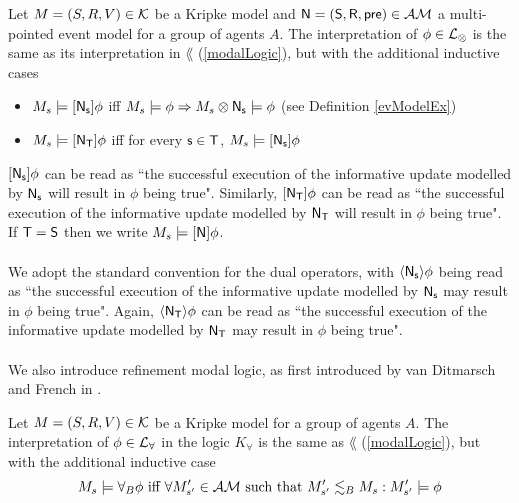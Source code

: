 \begin{defn} \label{actModelLogic}
Let $M = (S, R, V) \in \mathcal{K}$ be a Kripke model and $\mathrm{\mathsf{\mathrm{\mathsf{N}}
  = (S, R, pre)}} \in
\mathcal{AM}$ a multi-pointed event model for a group of agents $A$.
The interpretation of $\phi \in \mathcal{L}_{\otimes}$ is the same as its interpretation in $\lang$
(\ref{modalLogic}), but with the additional
inductive cases
\begin{itemize}
	\item $M_s \models [{\mathrm{\mathsf{\mathrm{\mathsf{N}}_s}}}] \phi$ iff $M_s \models
  \phi \Rightarrow M_s \otimes \mathrm{\mathsf{\mathrm{\mathsf{N}}_s}} \models
	\phi$ (see Definition \ref{evModelEx})
	\item $M_s \models [{\mathrm{\mathsf{\mathrm{\mathsf{N}}_T}}}] \phi$ iff for every $\mathrm{\mathsf{s
    \in T}}$, $M_s \models [{\mathrm{\mathsf{\mathrm{\mathsf{N}}_s}}}] \phi$ 
\end{itemize}
\end{defn}
$[{\mathrm{\mathsf{\mathrm{\mathsf{N}}_s}}}] \phi$ can be read as ``the successful execution of the informative update modelled by
$\mathrm{\mathsf{\mathrm{\mathsf{N}}_s}}$ will result in $\phi$ being true".
Similarly, $[{\mathrm{\mathsf{\mathrm{\mathsf{N}}_T}}}] \phi$ can be read as ``the successful execution of the informative update
modelled by $\mathrm{\mathsf{\mathrm{\mathsf{N}}_T}}$ will result in $\phi$ being true".
If $\mathrm{\mathsf{T = S}}$ then we write $M_s \models [{\mathrm{\mathsf{\mathrm{\mathsf{N}}}}}] \phi$.\\
\\
We adopt the standard convention for the dual operators, with $\langle {
   \ensuremath {\mathrm{\mathsf{\mathrm{\mathsf{N}}_s}}}  } \rangle \phi$ being
read as ``the successful execution of the informative update modelled by
$\mathrm{\mathsf{\mathrm{\mathsf{N}}_s}}$ may result in
$\phi$ being true".
Again, $\langle {  \ensuremath {\mathrm{\mathsf{\mathrm{\mathsf{N}}_T}}}  } \rangle \phi$ can be read as ``the successful execution of the informative
update modelled by $\mathrm{\mathsf{\mathrm{\mathsf{N}}_T}}$ may result in $\phi$ being true".\\
\\
We also introduce refinement modal logic, as first introduced by van Ditmarsch and French in
\cite{van2009simulation}.

\begin{defn} \label{refineLogic}
Let $M = (S, R, V) \in \mathcal{K}$ be a Kripke model for a group of agents $A$.
The interpretation of $\phi \in \mathcal{L}_{\forall}$ in the logic $K_\forall$ is the same as $\lang$
(\ref{modalLogic}), but with the additional inductive case
\[
	M_s \models \forall_B \phi \text{ iff } \forall M'_{s'} \in
  \mathcal{AM} \text{ such that } M'_{s'}
	\lesssim_B M_s : M'_{s'} \models \phi
\]
\end{defn}

